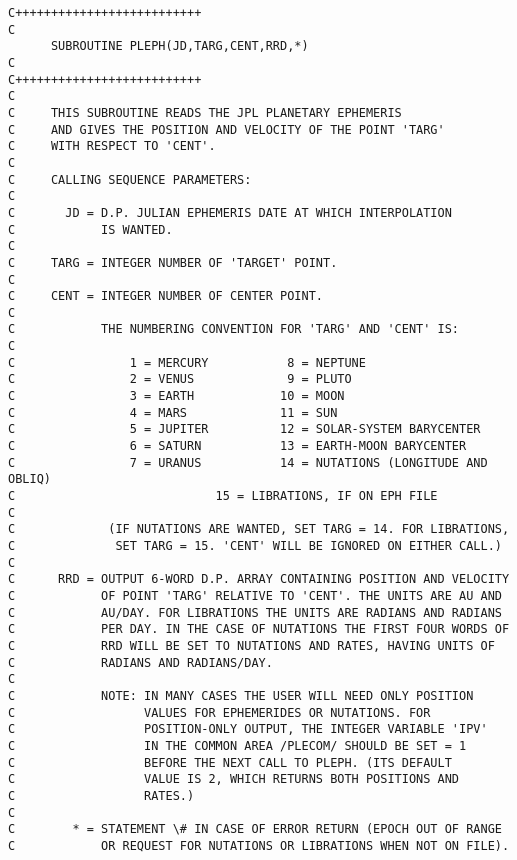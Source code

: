 \documentclass[twoside,11pt]{article}
\renewcommand{\_}{\texttt{\symbol{95}}}
\newcommand{\hdg}[1]{\vskip4pt plus2pt\leavevmode\kern-1em \underline{\large{#1}}\par}
\newcommand{\hdg}[1]{\subsection*{{#1}}}
\begin{document}
\begin{verbatim}
C++++++++++++++++++++++++++
C
      SUBROUTINE PLEPH(JD,TARG,CENT,RRD,*)
C
C++++++++++++++++++++++++++
C
C     THIS SUBROUTINE READS THE JPL PLANETARY EPHEMERIS
C     AND GIVES THE POSITION AND VELOCITY OF THE POINT 'TARG'
C     WITH RESPECT TO 'CENT'.
C
C     CALLING SEQUENCE PARAMETERS:
C
C       JD = D.P. JULIAN EPHEMERIS DATE AT WHICH INTERPOLATION
C            IS WANTED.
C
C     TARG = INTEGER NUMBER OF 'TARGET' POINT.
C
C     CENT = INTEGER NUMBER OF CENTER POINT.
C
C            THE NUMBERING CONVENTION FOR 'TARG' AND 'CENT' IS:
C
C                1 = MERCURY           8 = NEPTUNE
C                2 = VENUS             9 = PLUTO
C                3 = EARTH            10 = MOON
C                4 = MARS             11 = SUN
C                5 = JUPITER          12 = SOLAR-SYSTEM BARYCENTER
C                6 = SATURN           13 = EARTH-MOON BARYCENTER
C                7 = URANUS           14 = NUTATIONS (LONGITUDE AND OBLIQ)
C                            15 = LIBRATIONS, IF ON EPH FILE
C
C             (IF NUTATIONS ARE WANTED, SET TARG = 14. FOR LIBRATIONS,
C              SET TARG = 15. 'CENT' WILL BE IGNORED ON EITHER CALL.)
C
C      RRD = OUTPUT 6-WORD D.P. ARRAY CONTAINING POSITION AND VELOCITY
C            OF POINT 'TARG' RELATIVE TO 'CENT'. THE UNITS ARE AU AND
C            AU/DAY. FOR LIBRATIONS THE UNITS ARE RADIANS AND RADIANS
C            PER DAY. IN THE CASE OF NUTATIONS THE FIRST FOUR WORDS OF
C            RRD WILL BE SET TO NUTATIONS AND RATES, HAVING UNITS OF
C            RADIANS AND RADIANS/DAY.
C
C            NOTE: IN MANY CASES THE USER WILL NEED ONLY POSITION
C                  VALUES FOR EPHEMERIDES OR NUTATIONS. FOR
C                  POSITION-ONLY OUTPUT, THE INTEGER VARIABLE 'IPV'
C                  IN THE COMMON AREA /PLECOM/ SHOULD BE SET = 1
C                  BEFORE THE NEXT CALL TO PLEPH. (ITS DEFAULT
C                  VALUE IS 2, WHICH RETURNS BOTH POSITIONS AND
C                  RATES.)
C
C        * = STATEMENT \# IN CASE OF ERROR RETURN (EPOCH OUT OF RANGE
C            OR REQUEST FOR NUTATIONS OR LIBRATIONS WHEN NOT ON FILE).
\end{verbatim}


\newpage                                               %


\end{document}
